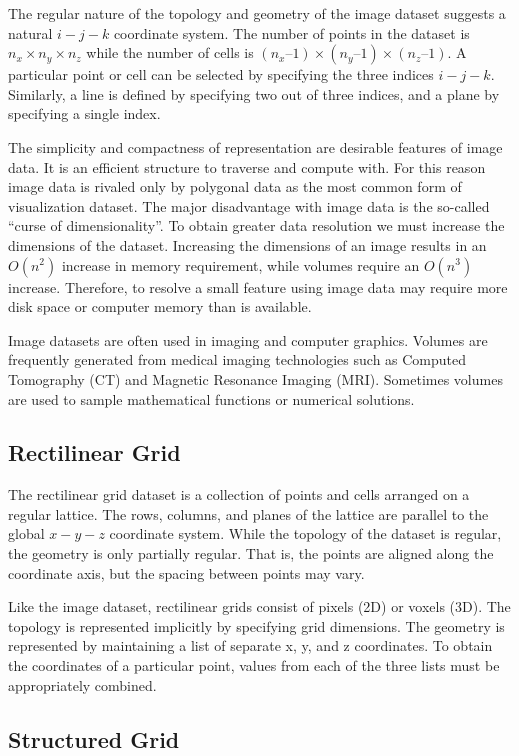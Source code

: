 The regular nature of the topology and geometry of the image dataset suggests a natural $i-j-k$ coordinate system. The number of points in the dataset is $n_x \times n_y \times n_z$ while the number of cells is $(n_x – 1) \times (n_y – 1) \times (n_z – 1)$. A particular point or cell can be selected by specifying the three indices $i-j-k$. Similarly, a line is defined by specifying two out of three indices, and a plane by specifying a single index.

The simplicity and compactness of representation are desirable features of image data. It is an efficient structure to traverse and compute with. For this reason image data is rivaled only by polygonal data as the most common form of visualization dataset. The major disadvantage with image data is the so-called ``curse of dimensionality''. To obtain greater data resolution we must increase the dimensions of the dataset. Increasing the dimensions of an image results in an $O(n^2)$ increase in memory requirement, while volumes require an $O(n^3)$ increase. Therefore, to resolve a small feature using image data may require more disk space or computer memory than is available.

Image datasets are often used in imaging and computer graphics. Volumes are frequently generated from medical imaging technologies such as Computed Tomography (CT) and Magnetic Resonance Imaging (MRI). Sometimes volumes are used to sample mathematical functions or numerical solutions.

\subsection{Rectilinear Grid}

The rectilinear grid dataset is a collection of points and cells arranged on a regular lattice. The rows, columns, and planes of the lattice are parallel to the global $x-y-z$ coordinate system. While the topology of the dataset is regular, the geometry is only partially regular. That is, the points are aligned along the coordinate axis, but the spacing between points may vary.

Like the image dataset, rectilinear grids consist of pixels (2D) or voxels (3D). The topology is represented implicitly by specifying grid dimensions. The geometry is represented by maintaining a list of separate x, y, and z coordinates. To obtain the coordinates of a particular point, values from each of the three lists must be appropriately combined.

\subsection{Structured Grid}

